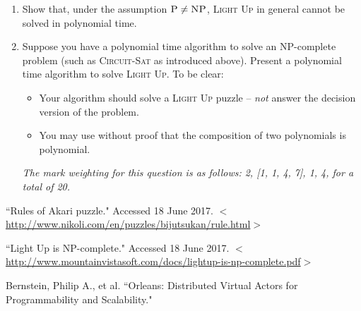 \documentclass[12pt, a4paper]{article}
\begin{document}
\begin{enumerate}
\begin{enumerate}
\end{enumerate}

\item Show that, under the assumption $\textsc{P} \neq \textsc{NP}$, \textsc{Light Up}
in general cannot be solved in polynomial time.
\item Suppose you have a polynomial time algorithm to solve an NP-complete problem
(such as \textsc{Circuit-Sat} as introduced above). Present a polynomial time algorithm to 
solve \textsc{Light Up}. To be clear:
\begin{itemize}
\item Your algorithm should solve a \textsc{Light Up} puzzle -- \textit{not} answer the
decision version of the problem.
\item You may use without proof that the composition of two polynomials is polynomial.
\end{itemize}

\textit{The mark weighting for this question is as follows: 2, [1, 1, 4, 7], 1, 4, for a total of 20.}

\end{enumerate}

\newpage
\begin{thebibliography}{9}
``Rules of Akari puzzle." Accessed 18 June 2017. $<$\url{http://www.nikoli.com/en/puzzles/bijutsukan/rule.html}$>$

``Light Up is NP-complete." Accessed 18 June 2017. $<$\url{http://www.mountainvistasoft.com/docs/lightup-is-np-complete.pdf}$>$

Bernstein, Philip A., et al. ``Orleans: Distributed Virtual Actors for Programmability and Scalability."
\end{thebibliography}

\newpage
\end{document}
